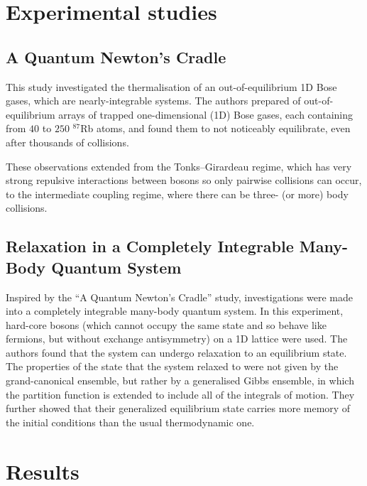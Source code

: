 \documentclass[a4paper,10pt]{article}
\begin{document}
\section{Experimental studies}
\subsection{A Quantum Newton's Cradle\cite{Kinoshita2006}}

This study investigated the thermalisation of an out-of-equilibrium 1D Bose gases, which are nearly-integrable systems. The authors prepared
of out-of-equilibrium arrays of trapped one-dimensional (1D) Bose gases, each containing from $40$ to $250$ $^{87}$Rb atoms, and found them to not noticeably equilibrate,
even after thousands of collisions. 

These observations extended from the Tonks–Girardeau regime, which has very strong repulsive interactions between bosons so only pairwise collisions can occur, to the intermediate 
coupling regime, where there can be three- (or more) body collisions. 

\subsection{Relaxation in a Completely Integrable Many-Body Quantum System \cite{Rigol2007}}

Inspired by the ``A Quantum Newton's Cradle'' study, investigations were made into a completely integrable many-body quantum system. In this experiment, hard-core bosons (which cannot
occupy the same state and so behave like fermions, but without exchange antisymmetry) on a 1D lattice were used. The authors found that the system can undergo relaxation to an equilibrium 
state. The properties of the state that the system relaxed to were not given by the grand-canonical ensemble, but rather by a generalised Gibbs ensemble, in which the partition function 
is extended to include all of the integrals of motion. They further showed that their generalized equilibrium state carries more memory of the initial conditions than the usual thermodynamic one.


\section{Results}
\end{document}
